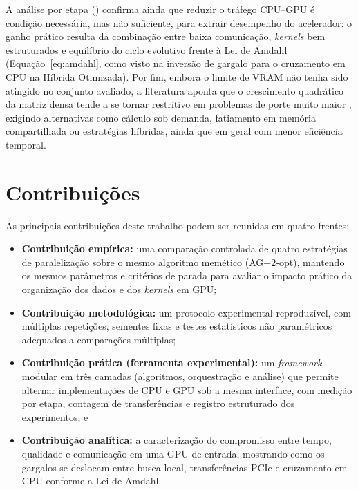 A análise por etapa () confirma ainda que reduzir o tráfego CPU--GPU é condição necessária, mas não suficiente, para extrair desempenho do acelerador: o ganho prático resulta da combinação entre baixa comunicação, \emph{kernels} bem estruturados e equilíbrio do ciclo evolutivo frente à Lei de Amdahl (Equação~\eqref{eq:amdahl}, como visto na inversão de gargalo para o cruzamento em CPU na Híbrida Otimizada).
Por fim, embora o limite de VRAM não tenha sido atingido no conjunto avaliado, a literatura aponta que o crescimento quadrático da matriz densa tende a se tornar restritivo em problemas de porte muito maior \autocite{schulz2013gpu,oneil2015rethinking}, exigindo alternativas como cálculo sob demanda, fatiamento em memória compartilhada ou estratégias híbridas, ainda que em geral com menor eficiência temporal.

\section{Contribuições}\label{sec-62-contribuicoes}

As principais contribuições deste trabalho podem ser reunidas em quatro frentes:

\begin{itemize}
      \item
            \textbf{Contribuição empírica:} uma comparação controlada de quatro estratégias de paralelização sobre o mesmo algoritmo memético (AG+\(2\)-opt), mantendo os mesmos parâmetros e critérios de parada para avaliar o impacto prático da organização dos dados e dos \emph{kernels} em GPU;
      \item
            \textbf{Contribuição metodológica:} um protocolo experimental reproduzível, com múltiplas repetições, sementes fixas e testes estatísticos não paramétricos adequados a comparações múltiplas;
      \item
            \textbf{Contribuição prática (ferramenta experimental):} um \emph{framework} modular em três camadas (algoritmos, orquestração e análise) que permite alternar implementações de CPU e GPU sob a mesma interface, com medição por etapa, contagem de transferências e registro estruturado dos experimentos; e
      \item
            \textbf{Contribuição analítica:} a caracterização do compromisso entre tempo, qualidade e comunicação em uma GPU de entrada, mostrando como os gargalos se deslocam entre busca local, transferências PCIe e cruzamento em CPU conforme a Lei de Amdahl.
\end{itemize}

